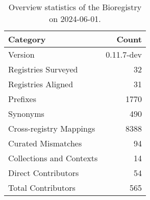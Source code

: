 \begin{table}
\caption{Overview statistics of the Bioregistry on 2024-06-01.}
\label{tab:bioregistry-summary}
\begin{tabular}{lr}
\toprule
Category & Count \\
\midrule
Version & 0.11.7-dev \\
Registries Surveyed & 32 \\
Registries Aligned & 31 \\
Prefixes & 1770 \\
Synonyms & 490 \\
Cross-registry Mappings & 8388 \\
Curated Mismatches & 94 \\
Collections and Contexts & 14 \\
Direct Contributors & 54 \\
Total Contributors & 565 \\
\bottomrule
\end{tabular}
\end{table}
